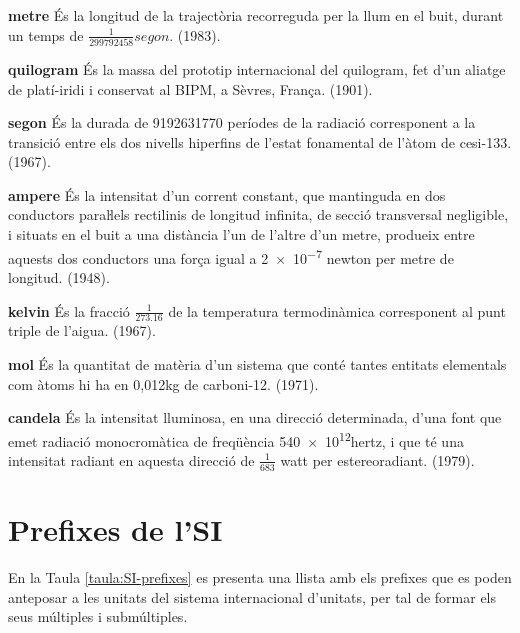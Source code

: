\begin{list}{}
   {\setlength{\labelwidth}{22mm} \setlength{\leftmargin}{22mm} \setlength{\labelsep}{2mm}}
   \item[\textbf{metre}] És la longitud de la trajectòria recorreguda per la llum
   en el buit, durant un temps de $\frac{1}{\num{299792458}}\unit{segon}$. (1983).
   \item[\textbf{quilogram}] És la massa del prototip internacional del quilogram, fet d'un aliatge de platí-iridi i
    conservat al BIPM, a Sèvres, França. (1901).
   \item[\textbf{segon}] És la durada de \num{9192631770} períodes de la
   radiació corresponent a la transició entre els dos nivells
  hiperfins de l'estat fonamental de l'àtom de cesi-133. (1967).
   \item[\textbf{ampere}] És la intensitat d'un corrent constant,
   que mantinguda en dos conductors paraŀlels rectilinis de longitud
   infinita, de secció transversal negligible, i situats en el buit a una
   distància l'un de l'altre d'un metre, produeix entre
   aquests dos conductors  una força igual a \num{2e-7} newton per metre de longitud. (1948).
   \item[\textbf{kelvin}] És la fracció $\frac{1}{\num{273,16}}$ de la temperatura
   termodinàmica corresponent al punt triple de l'aigua. (1967).
   \item[\textbf{mol}] És la quantitat de matèria d'un sistema que conté tantes
   entitats elementals com àtoms hi ha en 0,012\unit{kg} de carboni-12. (1971).
   \item[\textbf{candela}] És la intensitat lluminosa, en una direcció determinada,
   d'una font que emet radiació monocromàtica de freqüència \num{540e12}\unit{hertz}, i
   que té una intensitat radiant en aquesta direcció de $\frac{1}{683}$ watt per estereoradiant. (1979).
\end{list}


\section{Prefixes de l'SI}

En la Taula \vref{taula:SI-prefixes} es presenta una llista amb els
prefixes que es poden anteposar a les unitats del sistema
internacional d'unitats, per tal de formar els seus múltiples i
submúltiples.


